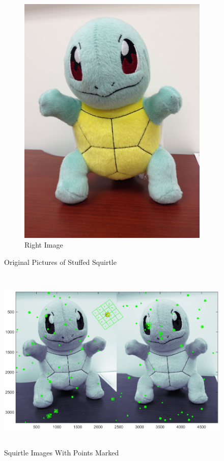 \documentclass[11pt,psfig]{article}
\begin{document}
\begin{figure}
\begin{subfigure}[b]{0.4\textwidth}
                \includegraphics[width=\textwidth]{squirtle2.jpg}
                \caption{Right Image}
        \end{subfigure}
        \caption{Original Pictures of Stuffed Squirtle}
        \label{1}
\end{figure}

\begin{figure}[H]
\centering
\includegraphics[height=3.5in]{squirtle_pointsWoMatching.png}
\caption{Squirtle Images With Points Marked}
\label{sq2}
\end{figure}
\end{document}
